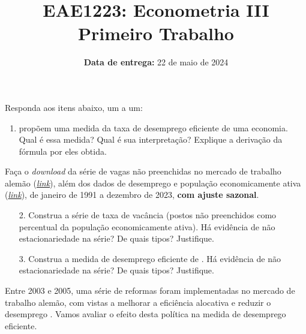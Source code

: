 \documentclass[12pt,a4paper]{article}
\title{ \large EAE1223: Econometria III \\
	{\large Primeiro Trabalho}}
\date{\small \textbf{Data de entrega:} 22 de maio de 2024}
\begin{document}
	\maketitle
	Responda aos itens abaixo, um a um:
\begin{enumerate}
	\item \citet{michaillat2022u} propõem uma medida da taxa de desemprego eficiente de uma economia. Qual é essa medida? Qual é sua interpretação? Explique a derivação da fórmula por eles obtida.
\end{enumerate}
	Faça o \textit{download} da série de vagas não preenchidas no mercado de trabalho alemão (\href{https://data-explorer.oecd.org/vis?tm=unfilled\%20vacancies\%20germany&pg=0&hc[Reference\%20area]=Germany&hc[Measure]=Unfilled\%20vacancies&snb=1&df[ds]=dsDisseminateFinalDMZ&df[id]=DSD_OLAB\%40DF_OIALAB_INDIC&df[ag]=OECD.SDD.TPS&df[vs]=1.1&pd=\%2C&dq=DEU.VAC_U.._Z.Y..M&ly[cl]=TIME_PERIOD&to[TIME_PERIOD]=false&lo=13&lom=LASTNPERIODS}{\textit{link}}), além dos dados de desemprego e população economicamente ativa (\href{https://www-genesis.destatis.de/genesis//online?operation=table&language=en&code=13231-0001&bypass=true&levelindex=0&levelid=1713437546333#abreadcrumb}{\textit{link}}), de janeiro de 1991 a dezembro de 2023, \textbf{com ajuste sazonal}.
	\begin{enumerate}
	\item[2.] Construa a série de taxa de vacância (postos não preenchidos como percentual da população economicamente ativa). Há evidência de não estacionariedade na série? De quais tipos? Justifique.
	
	\item[3.] Construa a medida de desemprego eficiente de \citet{michaillat2022u}. Há evidência de não estacionariedade na série? De quais tipos? Justifique.
	
\end{enumerate}
	Entre 2003 e 2005, uma série de reformas foram implementadas no mercado de trabalho alemão, com vistas a melhorar a eficiência alocativa e reduzir o desemprego \citep{Bradley2019}. Vamos avaliar o efeito desta política na medida de desemprego eficiente.
\end{document}
